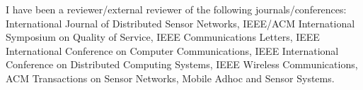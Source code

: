 I have been a reviewer/external reviewer of the following journals/conferences:
International Journal of Distributed Sensor Networks, 
IEEE/ACM International Symposium on Quality of Service,
IEEE Communications Letters,
IEEE International Conference on Computer Communications,
IEEE International Conference on Distributed Computing Systems,
IEEE Wireless Communications,
ACM Transactions on Sensor Networks,
Mobile Adhoc and Sensor Systems.
